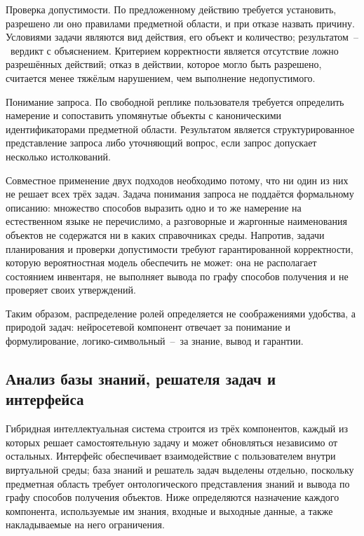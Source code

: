 Проверка допустимости. По предложенному действию требуется установить, разрешено
ли оно правилами предметной области, и при отказе назвать причину. Условиями задачи
являются вид действия, его объект и количество; результатом~--~вердикт с
объяснением. Критерием корректности является отсутствие ложно разрешённых действий;
отказ в действии, которое могло быть разрешено, считается менее тяжёлым нарушением,
чем выполнение недопустимого.

Понимание запроса. По свободной реплике пользователя требуется определить намерение
и сопоставить упомянутые объекты с каноническими идентификаторами предметной
области. Результатом является структурированное представление запроса либо
уточняющий вопрос, если запрос допускает несколько истолкований.

Совместное применение двух подходов необходимо потому, что ни один из них не решает
всех трёх задач. Задача понимания запроса не поддаётся
формальному описанию: множество способов выразить одно и то же намерение на
естественном языке не перечислимо, а разговорные и жаргонные наименования объектов
не содержатся ни в каких справочниках среды. Напротив, задачи планирования и
проверки допустимости требуют гарантированной корректности, которую вероятностная
модель обеспечить не может: она не располагает состоянием инвентаря, не выполняет
вывода по графу способов получения и не проверяет своих
утверждений\cite{Russell2021,Ji2023,Jurafsky2024}.

Таким образом, распределение ролей определяется не соображениями удобства, а
природой задач: нейросетевой компонент отвечает за понимание и формулирование,
логико-символьный~--~за знание, вывод и гарантии.

\subsection{Анализ базы знаний, решателя задач и интерфейса}

Гибридная интеллектуальная система строится из трёх компонентов, каждый из которых
решает самостоятельную задачу и может обновляться независимо от остальных. Интерфейс
обеспечивает взаимодействие с пользователем внутри виртуальной среды; база знаний
и решатель задач выделены отдельно, поскольку предметная область требует
онтологического представления знаний и вывода по графу способов получения объектов.
Ниже определяются назначение каждого компонента, используемые им знания, входные и
выходные данные, а также накладываемые на него ограничения.

